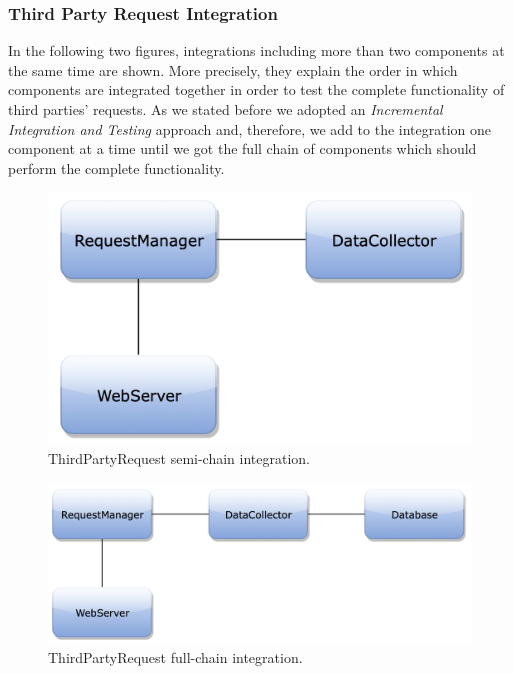 \newpage
\subsubsection{Third Party Request Integration}
In the following two figures, integrations including more than two components at the same time are shown. More precisely, they explain the order in which components are integrated together in order to test the complete functionality of third parties' requests. As we stated before we adopted  an \textit{Incremental Integration and Testing} approach and, therefore, we add to the integration one component at a time until we got the full chain of components which should perform the complete functionality.
\begin{figure}[H]
\centering
\includegraphics[scale=0.35]{Images/IntegrationPlanImages/fig15.png}
\caption{ThirdPartyRequest semi-chain integration.}
\end{figure}

\begin{figure}[H]
\centering
\includegraphics[scale=0.35]{Images/IntegrationPlanImages/fig16.png}
\caption{ThirdPartyRequest full-chain integration.}
\end{figure}

